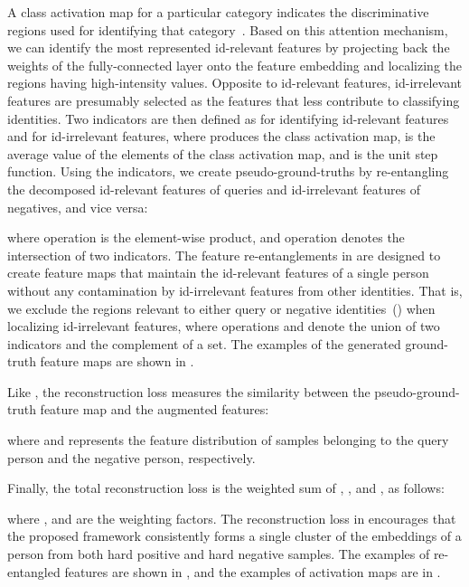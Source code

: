 A class activation map for a particular category indicates the discriminative regions used for identifying that category~\cite{zhou2016learning}. Based on this attention mechanism, we can identify the most represented id-relevant features by projecting back the weights of the fully-connected layer onto the feature embedding and localizing the regions having high-intensity values. Opposite to id-relevant features, id-irrelevant features are presumably selected as the features that less contribute to classifying identities. Two indicators are then defined as  for identifying id-relevant features and  for id-irrelevant features, where  produces the class activation map,  is the average value of the elements of the class activation map, and  is the unit step function. Using the indicators, we create pseudo-ground-truths by re-entangling the decomposed id-relevant features of queries and id-irrelevant features of negatives, and vice versa:

where operation  is the element-wise product, and operation  denotes the intersection of two indicators. The feature re-entanglements in  are designed to create feature maps that maintain the id-relevant features of a single person without any contamination by id-irrelevant features from other identities. That is, we exclude the regions relevant to either query or negative identities~(\ie ) when localizing id-irrelevant features, where operations  and  denote the union of two indicators and the complement of a set. The examples of the generated ground-truth feature maps are shown in . 

Like , the reconstruction loss measures the similarity between the pseudo-ground-truth feature map  and the augmented features:  

where  and  represents the feature distribution of samples belonging to the query person and the negative person, respectively. 

Finally, the total reconstruction loss  is the weighted sum of ,  , and ,  as follows:

where ,  and  are the weighting factors. The reconstruction loss in  encourages that the proposed framework consistently forms a single cluster of the embeddings of a person from both hard positive and hard negative samples. The examples of re-entangled features are shown in , and the examples of activation maps are in . 
\vspace{0.2cm}